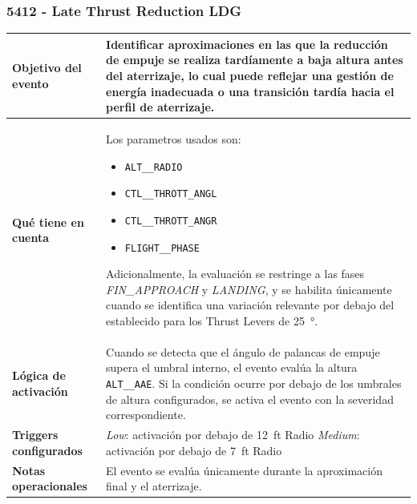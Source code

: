 \documentclass[11pt,a4paper]{article}
\begin{document}
	\subsubsection{5412 - Late Thrust Reduction LDG}
	\begin{table}[H]
		\centering
		\renewcommand{\arraystretch}{1.3}
		\begin{tabular}{p{5cm} p{9.5cm}}
			\hline
			\textbf{Objetivo del evento} &
			Identificar aproximaciones en las que la reducción de empuje se realiza tardíamente a baja altura antes del aterrizaje, lo cual puede reflejar una gestión de energía inadecuada o una transición tardía hacia el perfil de aterrizaje. \\
			\hline
			\textbf{Qué tiene en cuenta} & Los parametros usados son:
			\begin{itemize}
				\item \texttt{ALT\_\_RADIO}
				\item \texttt{CTL\_\_THROTT\_ANGL}
				\item \texttt{CTL\_\_THROTT\_ANGR}
				\item \texttt{FLIGHT\_\_PHASE}
			\end{itemize}
			Adicionalmente, la evaluación se restringe a las fases \textit{FIN\_APPROACH} y \textit{LANDING}, y se habilita únicamente cuando se identifica una variación relevante por debajo del establecido para los Thrust Levers de \SI{25}{\degree}. \\
			\hline
			\textbf{Lógica de activación} &
			Cuando se detecta que el ángulo de palancas de empuje supera el umbral interno, el evento evalúa la altura \texttt{ALT\_\_AAE}. Si la condición ocurre por debajo de los umbrales de altura configurados, se activa el evento con la severidad correspondiente. \\
			\hline
			\textbf{Triggers configurados} &
			\textit{Low}: activación por debajo de \SI{12}{ft} Radio \newline
			\textit{Medium}: activación por debajo de \SI{7}{ft} Radio \newline \\
			\hline
			\textbf{Notas operacionales} &
			El evento se evalúa únicamente durante la aproximación final y el aterrizaje. \\
			\hline
		\end{tabular}
	\end{table}
\end{document}
